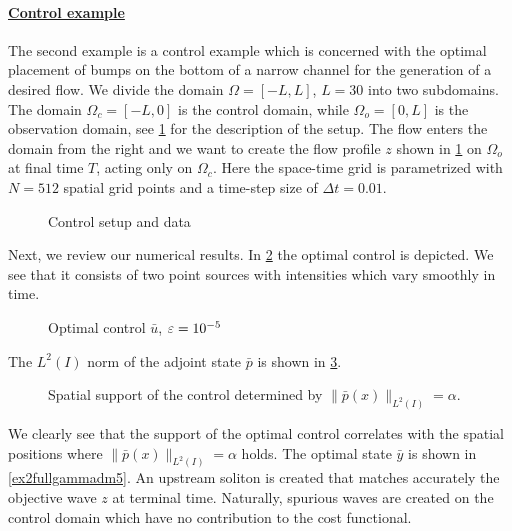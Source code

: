 \paragraph{\underline{Control example}}
 The second example is a control example which is concerned with the optimal placement of bumps on the bottom of a narrow channel for the generation of a desired flow. We divide the domain $\Omega = [-L,L]$, $L=30$ into two subdomains. The domain $\Omega_c = [-L,0]$ is the control domain, while $\Omega_{o} = [0,L]$ is the observation domain, see \cref{controlsetup} for the description of the setup. The flow enters the domain from the right and we want to create the flow profile $z$ shown in \cref{controlsetup} on $\Omega_{o}$ at final time $T$, acting only on $\Omega_c$. Here the space-time grid is parametrized with $N = 512$ spatial grid points and a time-step size of $\Delta t = 0.01$.
\begin{figure}[htb]
\centering
{}\quad
\subfloat{}
\caption{Control setup and data}
\label{controlsetup}
\end{figure}
Next, we review our numerical results. In \cref{recoveredcontrol2} the optimal control is depicted. We see that it consists of two point sources with intensities which vary smoothly in time.
\begin{figure}[htb]
\centering
\subfloat{}\quad
\subfloat{}
\caption{Optimal control $\bar u$, $\varepsilon = 10^{-5}$}
\label{recoveredcontrol2}
\end{figure}
The $L^2(I)$ norm of the adjoint state $\bar p$ is shown in \cref{supportIP}.
\begin{figure}[htb]
\centering

\caption{Spatial support of the control determined by $\|\bar p(x)\|_{L^2(I)}=\alpha$.}
\label{supportIP}
\end{figure}
We clearly see that the support of the optimal control correlates with the spatial positions where $\|\bar p(x)\|_{L^2(I)}=\alpha$ holds. The optimal state $\bar y$ is shown in \cref{ex2fullgammadm5}. An upstream soliton is created that matches accurately the objective wave $z$ at terminal time. Naturally, spurious waves are created on the control domain which have no contribution to the cost functional.
